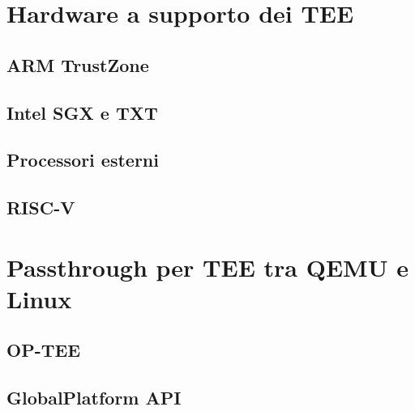 \documentclass[12pt,italian]{report}
\begin{document}
\chapter{Hardware a supporto dei TEE}
\label{chap:hardware-supporto-tee}

\section{ARM TrustZone}
\label{sec:arm-trustzone}

\section{Intel SGX e TXT}
\label{sec:intel-sgx-txt}

\section{Processori esterni}
\label{sec:processori-esterni}

\section{RISC-V}
\label{sec:risc-v}


\chapter{Passthrough per TEE tra QEMU e Linux}
\label{chap:passthrough-tee-qemu-linux}

\section{OP-TEE}
\label{sec:architettura-op-tee}

\section{GlobalPlatform API}
\label{sec:global-platform-api}
\end{document}
